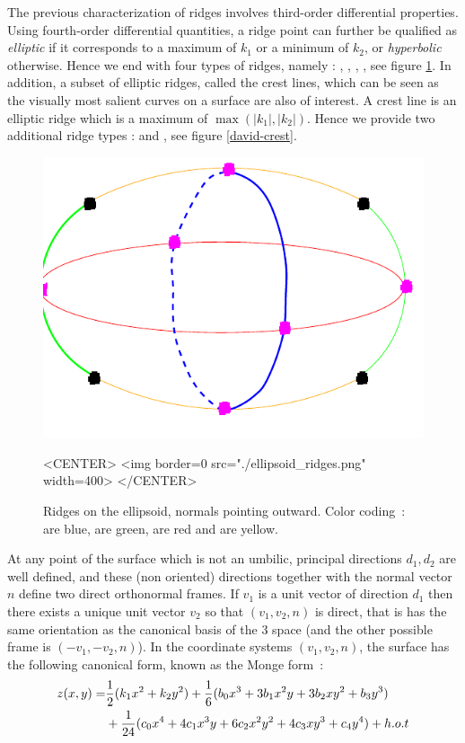 The previous characterization of ridges involves third-order
differential properties. Using fourth-order differential quantities, a
ridge point can further be qualified as {\em elliptic} if it
corresponds to a maximum of $k_1$ or a minimum of $k_2$, or {\em
hyperbolic} otherwise. Hence we end with four types of ridges, namely
: , , ,
, see figure \ref{ellipsoid-ridges}.
In addition, a subset of elliptic ridges, called the crest lines,
which can be seen as the visually most salient curves on a surface are
also of interest. A crest line is an elliptic ridge which is a maximum
of $\max(|k_1|,|k_2|)$. Hence we provide two additional ridge types :
 and , see figure \ref{david-crest}.


\begin{figure}[!ht]
\begin{ccTexOnly}
\centerline{
\includegraphics[width=.5\linewidth]{Ridges_3/ellipsoid_ridges}}
\end{ccTexOnly}

\begin{ccHtmlOnly}
<CENTER> <img border=0 src="./ellipsoid_ridges.png" width=400>
</CENTER>
\end{ccHtmlOnly}
\caption{Ridges on the ellipsoid, normals pointing outward.
 Color coding~:  are blue,
 are green,  are red and 
 are yellow.}
\label{ellipsoid-ridges}
\end{figure}

At any point of the surface which is not an umbilic, principal
directions $d_1, d_2$ are well defined, and these (non oriented)
directions together with the normal vector $n$ define two direct
orthonormal frames. If $v_1$ is a unit vector of direction $d_1$ then
there exists a unique unit vector $v_2$ so that $(v_1,v_2,n)$ is
direct, that is has the same orientation as the canonical basis of the
3 space (and the other possible frame is $(-v_1,-v_2,n)$). In the
coordinate systems $(v_1,v_2,n)$, the surface has the following
canonical form, known as the Monge form~:
%
\begin{eqnarray}
\label{eq:monge}
z(x,y) =  & \frac{1}{2}(k_1x^2 + k_2y^2)+
	\frac{1}{6}(b_0x^3+3b_1x^2y+3b_2xy^2+b_3y^3) \\
  &  +\frac{1}{24}(c_0x^4+4c_1x^3y+6c_2x^2y^2+4c_3xy^3+c_4y^4) + h.o.t
\end{eqnarray}

